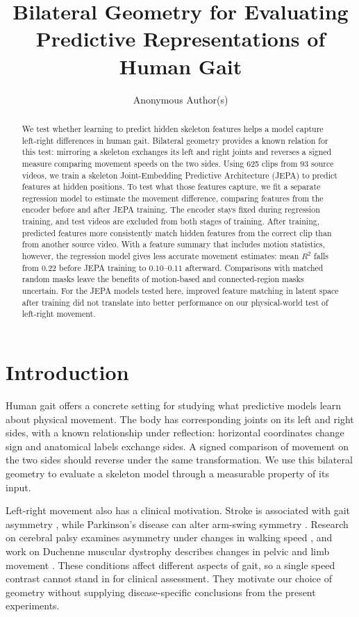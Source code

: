 \documentclass{article}
\title{Bilateral Geometry for Evaluating Predictive Representations of Human Gait}
\author{Anonymous Author(s)}
\begin{document}
\maketitle
\begin{abstract}
We test whether learning to predict hidden skeleton features helps a model capture left-right differences in human gait. Bilateral geometry provides a known relation for this test: mirroring a skeleton exchanges its left and right joints and reverses a signed measure comparing movement speeds on the two sides. Using 625 clips from 93 source videos, we train a skeleton Joint-Embedding Predictive Architecture (JEPA) to predict features at hidden positions. To test what those features capture, we fit a separate regression model to estimate the movement difference, comparing features from the encoder before and after JEPA training. The encoder stays fixed during regression training, and test videos are excluded from both stages of training. After training, predicted features more consistently match hidden features from the correct clip than from another source video. With a feature summary that includes motion statistics, however, the regression model gives less accurate movement estimates: mean \(R^2\) falls from \(0.22\) before JEPA training to \(0.10\)--\(0.11\) afterward. Comparisons with matched random masks leave the benefits of motion-based and connected-region masks uncertain. For the JEPA models tested here, improved feature matching in latent space after training did not translate into better performance on our physical-world test of left-right movement.
\end{abstract}
\section{Introduction}\label{introduction}

Human gait offers a concrete setting for studying what predictive models learn about physical movement. The body has corresponding joints on its left and right sides, with a known relationship under reflection: horizontal coordinates change sign and anatomical labels exchange sides. A signed comparison of movement on the two sides should reverse under the same transformation. We use this bilateral geometry to evaluate a skeleton model through a measurable property of its input.

Left-right movement also has a clinical motivation. Stroke is associated with gait asymmetry \citep{ref01}, while Parkinson's disease can alter arm-swing symmetry \citep{ref02}. Research on cerebral palsy examines asymmetry under changes in walking speed \citep{ref03}, and work on Duchenne muscular dystrophy describes changes in pelvic and limb movement \citep{ref04}. These conditions affect different aspects of gait, so a single speed contrast cannot stand in for clinical assessment. They motivate our choice of geometry without supplying disease-specific conclusions from the present experiments.
\end{document}
